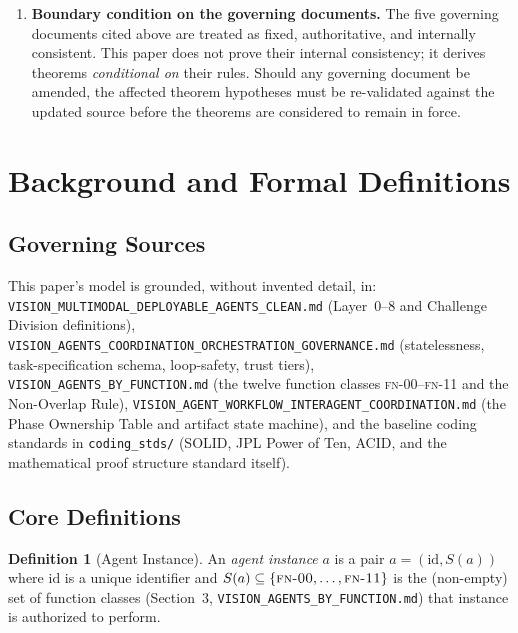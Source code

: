 \documentclass[12pt]{article}
\theoremstyle{definition}
\newtheorem{definition}[theorem]{Definition}
\newcommand{\code}[1]{\texttt{#1}}
\newcommand{\FN}[1]{\textsc{fn-#1}}
\newcommand{\VisionClean}{\code{VISION\_MULTIMODAL\_\allowbreak DEPLOYABLE\_\allowbreak AGENTS\_CLEAN.md}}
\newcommand{\VisionGov}{\code{VISION\_AGENTS\_\allowbreak COORDINATION\_\allowbreak ORCHESTRATION\_\allowbreak GOVERNANCE.md}}
\newcommand{\VisionFunc}{\code{VISION\_AGENTS\_\allowbreak BY\_FUNCTION.md}}
\newcommand{\VisionFlow}{\code{VISION\_AGENT\_\allowbreak WORKFLOW\_\allowbreak INTERAGENT\_\allowbreak COORDINATION.md}}
\begin{document}
\begin{enumerate}
    \item \textbf{Boundary condition on the governing documents.}
          The five governing documents cited above are treated as fixed,
          authoritative, and internally consistent.
          This paper does not prove their internal consistency; it
          derives theorems \emph{conditional on} their rules.
          Should any governing document be amended, the affected theorem
          hypotheses must be re-validated against the updated source
          before the theorems are considered to remain in force.

\end{enumerate}

\section{Background and Formal Definitions}
\label{sec:background}

\subsection{Governing Sources}
\begin{sloppypar}
This paper's model is grounded, without invented detail, in:
\VisionClean{} (Layer~0--8 and
Challenge Division definitions), \VisionGov{} (statelessness, task-specification
schema, loop-safety, trust tiers), \VisionFunc{}
(the twelve function classes \FN{00}--\FN{11} and the Non-Overlap Rule),
\VisionFlow{} (the Phase
Ownership Table and artifact state machine), and the baseline coding
standards in \code{coding\_stds/} (SOLID, JPL Power of Ten, ACID, and the
mathematical proof structure standard itself).
\end{sloppypar}

\subsection{Core Definitions}

\begin{definition}[Agent Instance]
\label{def:agent}
An \emph{agent instance} $a$ is a pair $a = (\mathrm{id}, S(a))$ where
$\mathrm{id}$ is a unique identifier and $S(a) \subseteq
\{\FN{00},\ldots,\FN{11}\}$ is the (non-empty) set of function classes
(Section~3, \VisionFunc{}) that instance is
authorized to perform.
\end{definition}
\end{document}
